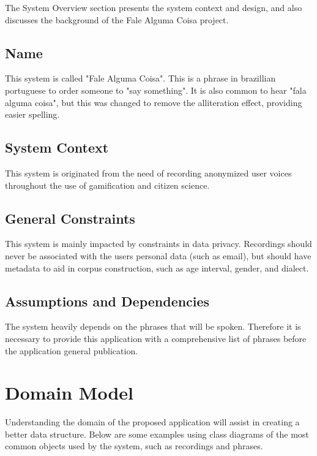 The System Overview section presents the system context and design, and also discusses the background of the Fale Alguma Coisa project.

\subsection{Name}

This system is called "Fale Alguma Coisa". This is a phrase in brazillian portuguese to order someone to "say something". It is also common to hear "fala alguma coisa", but this was changed to remove the alliteration effect, providing easier spelling.

\subsection{System Context}

This system is originated from the need of recording anonymized user voices throughout the use of gamification and citizen science.

\subsection{General Constraints}

This system is mainly impacted by constraints in data privacy. Recordings should never be associated with the users personal data (such as email), but should have metadata to aid in corpus construction, such as age interval, gender, and dialect.

\subsection{Assumptions and Dependencies}

The system heavily depends on the phrases that will be spoken. Therefore it is necessary to provide this application with a comprehensive list of phrases before the application general publication.

\section{Domain Model}
\label{appendix:srs:domain-model}

Understanding the domain of the proposed application will assist in creating a better data structure. Below are some examples using class diagrams of the most common objects used by the system, such as recordings and phrases.

